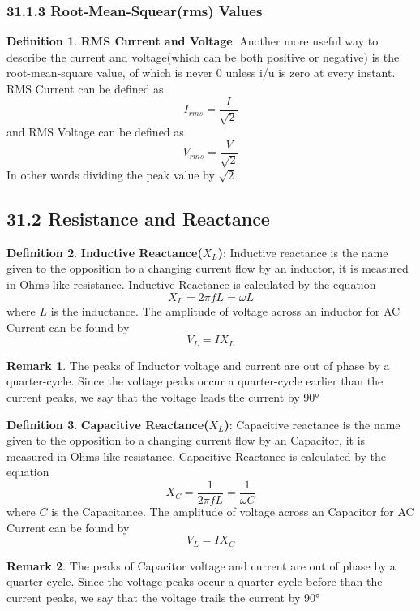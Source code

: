 \documentclass[12pt]{amsart}
\theoremstyle{definition}
\newtheorem{definition}{Definition} %
\newtheorem*{remark}{Remark}        %
\numberwithin{equation}{theorem}    %
\begin{document}
\subsubsection*{31.1.3 Root-Mean-Squear(rms) Values}

\begin{definition}
    \textbf{RMS Current and Voltage}:
    Another more useful way to describe the current and voltage(which can be both positive or negative) is the root-mean-square value, of which is never 0 unless i/u is zero at every instant. RMS Current can be defined as $$I_{rms} = \frac{I}{\sqrt{2}}$$ and RMS Voltage can be defined as$$V_{rms} = \frac{V}{\sqrt{2}}$$ In other words dividing the peak value by $\sqrt{2}$.
\end{definition}

\subsection*{31.2 Resistance and Reactance}

\begin{definition}
    \textbf{Inductive Reactance($X_L$)}:
    Inductive reactance is the name given to the opposition to a changing current flow by an inductor, it is measured in Ohms like resistance. Inductive Reactance is calculated by the equation 
    $$X_L = 2\pi f L = \omega L$$ where $L$ is the inductance. The amplitude of voltage across an inductor for AC Current can be found by $$V_L = IX_L$$
    \begin{remark}
        The peaks of Inductor voltage and current are out of phase by a quarter-cycle. Since the voltage peaks occur a quarter-cycle earlier than the current peaks, we say that the voltage leads the current by 90°
    \end{remark}
\end{definition}

\begin{definition}
    \textbf{Capacitive Reactance($X_L$)}:
    Capacitive reactance is the name given to the opposition to a changing current flow by an Capacitor, it is measured in Ohms like resistance. Capacitive Reactance is calculated by the equation 
    $$X_C = \frac{1}{2\pi f L} = \frac{1}{\omega C}$$ where $C$ is the Capacitance. The amplitude of voltage across an Capacitor for AC Current can be found by $$V_L = IX_C$$
    \begin{remark}
        The peaks of Capacitor voltage and current are out of phase by a quarter-cycle. Since the voltage peaks occur a quarter-cycle before than the current peaks, we say that the voltage trails the current by 90°
    \end{remark}
\end{definition}
\end{document}

